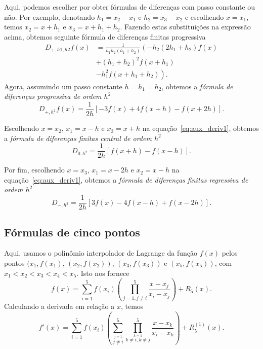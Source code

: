 Aqui, podemos escolher por obter fórmulas de diferenças com passo constante ou não. Por exemplo, denotando $h_1=x_2-x_1$ e $h_2=x_3-x_2$ e escolhendo $x=x_1$, temos $x_2 = x+h_1$ e $x_3 = x+h_1+h_2$. Fazendo estas substituições na expressão acima, obtemos seguinte fórmula de diferenças finitas progressiva
\begin{align}
  D_{+,h1,h2}f(x) &= \frac{1}{h_{1} h_{2} \left(h_{1} + h_{2}\right)} \left(- h_{2} \left(2 h_{1} + h_{2}\right) f{\left (x \right )} \right.\\
    &+ \left. \left(h_{1} + h_{2}\right)^{2} f{\left (x + h_{1} \right )} \right.\\
    &- \left. h_{1}^{2} f{\left (x + h_{1} + h_{2} \right )} \right).
\end{align}
Agora, assumindo um passo constante $h=h_1=h_2$, obtemos a \emph{fórmula de diferenças progressiva de ordem $h^2$}
\begin{equation}
  D_{+,h^2}f(x) = \frac{1}{2 h} \left[- 3 f{\left (x \right )} + 4 f{\left (x + h \right )} - f{\left (x + 2 h \right )}\right].\label{eq:dfp_3pts}
\end{equation}

Escolhendo $x=x_2$, $x_1=x-h$ e $x_3=x+h$ na equação~\eqref{eq:aux_deriv1}, obtemos a \emph{fórmula de diferenças finitas central de ordem $h^2$}
\begin{equation}
  D_{0,h^2} = \frac{1}{2 h} \left[f{\left (x + h \right )} - f{\left (x - h \right )}\right].
\end{equation}

Por fim, escolhendo $x=x_3$, $x_1=x-2h$ e $x_2=x-h$ na equação~\eqref{eq:aux_deriv1}, obtemos a \emph{fórmula de diferenças finitas regressiva de ordem $h^2$}
\begin{equation}
  D_{-,h^2} = \frac{1}{2 h} \left[3 f{\left (x \right )} - 4 f{\left (x - h \right )}  + f{\left (x - 2 h\right )}\right].
\end{equation}

\subsection{Fórmulas de cinco pontos}

Aqui, usamos o polinômio interpolador de Lagrange da função $f(x)$ pelos pontos $(x_1, f(x_1)$, $(x_2, f(x_2))$, $(x_3, f(x_3))$ e $(x_5, f(x_5))$, com $x_1 < x_2 < x_3 < x_4 < x_5$. Isto nos fornece
\begin{equation}
  f(x) = \sum_{i=1}^5 f(x_i)\left(\prod_{j=1, j\neq i}^{5} \frac{x-x_j}{x_i-x_j}\right) + R_5(x).
\end{equation}
Calculando a derivada em relação a $x$, temos
\begin{equation}\label{eq:aux_deriv2}
  f'(x) = \sum_{i=1}^5 f(x_i)\left(\sum_{\overset{j=1}{j\neq i}}^5\prod_{\overset{k=1}{k\neq i, k\neq j}}^{5} \frac{x-x_k}{x_i-x_k}\right) + R^{(1)}_5(x).
\end{equation}

